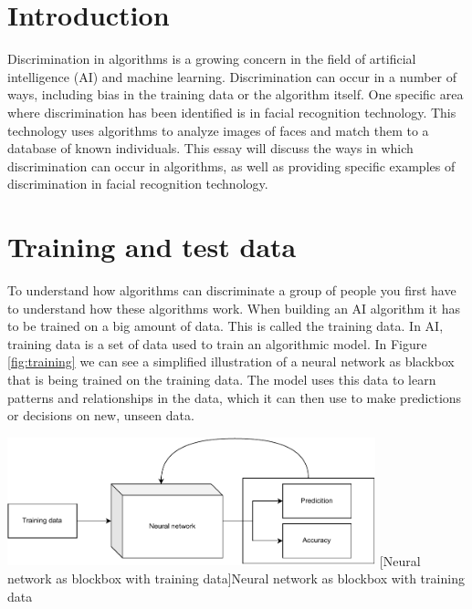 \documentclass[
	12pt,
    a4paper,
    egregdoesnotlikesansseriftitles, %
    toc=chapterentrywithdots,
    oneside, openany,
    titlepage,
    parskip=half,
    headings=normal,  %
    listof=totoc,
    bibliography=totocnumbered,
    index=totoc,
    captions=tableheading,  %
    listof=flat,
    numbers=noenddot, %
    final]
    {scrbook}
\begin{document}
\setcounter{secnumdepth}{3}  %
\setcounter{tocdepth}{2}  %


\frontmatter


\tableofcontents

\listoffigures
\clearpage %


\renewcommand{\lstlistlistingname}{List of Listings}  %
\clearpage %

\mainmatter

\chapter{Introduction}
Discrimination in algorithms is a growing concern in the field of artificial intelligence (AI) and machine learning. 
Discrimination can occur in a number of ways, including bias in the training data or the algorithm itself. 
One specific area where discrimination has been identified is in facial recognition technology. This technology uses algorithms to analyze images of faces and match them to a database of known individuals.
This essay will discuss the ways in which discrimination can occur in algorithms, as well as providing specific examples of discrimination in facial recognition technology.

\chapter{Training and test data}
To understand how algorithms can discriminate a group of people you first have to understand how these algorithms work. 
When building an AI algorithm it has to be trained on a big amount of data. 
This is called the training data. 
In AI, training data is a set of data used to train an algorithmic model. 
In Figure \ref{fig:training} we can see a simplified illustration of a neural network as blackbox that is being trained on the training data.
The model uses this data to learn patterns and relationships in the data, which it can then use to make predictions or decisions on new, unseen data. 

\vspace{1em}
\begin{minipage}{\linewidth}
	\centering
	\includegraphics[width=0.8\textwidth]{figures/training.pdf}
	[Neural network as blockbox with training data]{Neural network as blockbox with training data}
	\label{fig:training}
\end{minipage}
\end{document}
